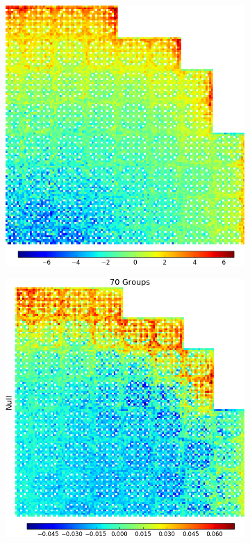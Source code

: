 \begin{figure}[h!]
\centering
\begin{subfigure}{.5\textwidth}
  \centering
  \includegraphics[width=0.9\linewidth]{figures/patterns/lns/full-core/capt-err-null}
  \caption{}
  \label{fig:chap9-full-core-null}
\end{subfigure}%
\begin{subfigure}{.5\textwidth}
  \centering
  \includegraphics[width=0.9\linewidth]{figures/patterns/lns/full-core/capt-err-null-magnitude}

\end{subfigure}
\end{figure}
